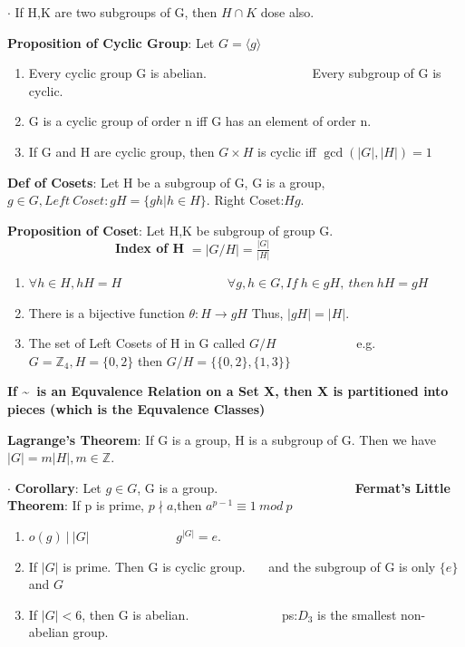 \documentclass[11pt]{article}
\begin{document}
$\cdot$ If H,K are two subgroups of G, then $H\cap K$ dose also.

\textbf{Proposition of Cyclic Group}: Let $G=\langle g \rangle$

\begin{enumerate}[itemsep=-2pt, topsep=-2pt]
    \item Every cyclic group G is abelian. \ \ \ \ \ \ \ \ \ \ \ \ \ \ \ \ Every subgroup of G is cyclic.
    \item G is a cyclic group of order n iff G has an element of order n.
    \item If G and H are cyclic group, then $G\times H$ is cyclic iff $\gcd(|G|,|H|)=1$
\end{enumerate}

\textbf{Def of Cosets}: Let H be a subgroup of G, G is a group, $g\in G,Left \ Coset:gH=\{gh|h\in H\}.$ Right Coset:$Hg.$

\textbf{Proposition of Coset}: Let H,K be subgroup of group G. \ \ \ \ \ \ \ \ \ \ \ \ \ \ \ \ \ \textbf{Index of H} $=|G/H|=\frac{|G|}{|H|}$
\begin{enumerate}[itemsep=-2pt, topsep=-2pt]
    \item $\forall h\in H,hH=H $ \ \ \ \ \ \ \ \ \ \ \ \ \ \ \ \ $\forall g,h\in G, If \ h\in gH, \ then \ hH=gH$
    \item There is a bijective function $\theta : H\to gH$ Thus, $|gH|=|H|.$
    \item The set of Left Cosets of H in G called $G/H$ \ \ \ \ \ \ \ \ \ \ \ \ e.g. $G=\mathbb{Z}_4,H=\{0,2\}$ then $G/H=\{\{0,2\},\{1,3\}\}$
\end{enumerate}

\textbf{If \textasciitilde \ is an Equvalence Relation on a Set X, then X is partitioned into pieces (which is the Equvalence Classes)}

\textbf{Lagrange's Theorem}: If G is a group, H is a subgroup of G. Then we have $|G|=m|H|,m\in \mathbb{Z}.$

$\cdot$ \textbf{Corollary}: Let $g\in G$, G is a group. \ \ \ \ \ \ \ \ \ \ \ \ \ \ \ \ \ \ \ \ \ \textbf{Fermat's Little Theorem}: If p is prime, $p \nmid a$,then $a^{p-1}\equiv 1 \ mod \ p$
\begin{enumerate}[itemsep=-2pt, topsep=-2pt]
    \item $o(g) \ | \ |G|$ \ \ \ \ \ \ \ \ \ \ \ \ \ $g^{|G|}=e.$
    \item If $|G|$ is prime. Then G is cyclic group. \ \ \ and the subgroup of G is only $\{e\}$ and $G$
    \item If $|G|<6$, then G is abelian. \ \ \ \ \ \ \ \ \ \ \ \ \ \ ps:$D_3$ is the smallest non-abelian group.
\end{enumerate}
\end{document}
